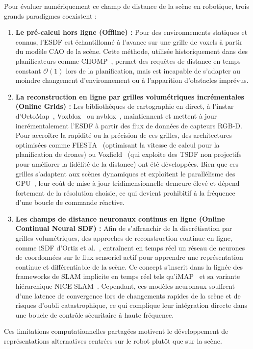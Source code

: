 Pour évaluer numériquement ce champ de distance de la scène en robotique, trois grands paradigmes coexistent :
\begin{enumerate}
    \item \textbf{Le pré-calcul hors ligne (Offline) :} Pour des environnements statiques et connus, l'\ac{ESDF} est échantillonné à l'avance sur une grille de voxels à partir du modèle \ac{CAO} de la scène. Cette méthode, utilisée historiquement dans des planificateurs comme \ac{CHOMP}~\cite{Zucker2013Chomp}, permet des requêtes de distance en temps constant $\mathcal{O}(1)$ lors de la planification, mais est incapable de s'adapter au moindre changement d'environnement ou à l'apparition d'obstacles imprévus.
    \item \textbf{La reconstruction en ligne par grilles volumétriques incrémentales (Online Grids) :} Les bibliothèques de cartographie en direct, à l'instar d'OctoMap~\cite{Hornung2013Octomap}, Voxblox~\cite{Oleynikova2017Voxblox} ou nvblox~\cite{Millane2024Nvblox}, maintiennent et mettent à jour incrémentalement l'\ac{ESDF} à partir des flux de données de capteurs \ac{RGB-D}. Pour accroître la rapidité ou la précision de ces grilles, des architectures optimisées comme FIESTA~\cite{Han2019Fiesta} (optimisant la vitesse de calcul pour la planification de drones) ou Voxfield~\cite{Pan2022Voxfield} (qui exploite des \ac{TSDF} non projectifs pour améliorer la fidélité de la distance) ont été développées. Bien que ces grilles s'adaptent aux scènes dynamiques et exploitent le parallélisme des \ac{GPU}~\cite{Bedada2024Real}, leur coût de mise à jour tridimensionnelle demeure élevé et dépend fortement de la résolution choisie, ce qui devient prohibitif à la fréquence d'une boucle de commande réactive.
    \item \textbf{Les champs de distance neuronaux continus en ligne (Online Continual Neural \ac{SDF}) :} Afin de s'affranchir de la discrétisation par grilles volumétriques, des approches de reconstruction continue en ligne, comme iSDF d'Ortiz et al.~\cite{Ortiz2022Isdf}, entraînent en temps réel un réseau de neurones de coordonnées sur le flux sensoriel actif pour apprendre une représentation continue et différentiable de la scène. Ce concept s'inscrit dans la lignée des frameworks de \ac{SLAM} implicite en temps réel tels qu'iMAP~\cite{Sucar2021Imap} et sa variante hiérarchique NICE-\ac{SLAM}~\cite{Zhu2022Niceslam}. Cependant, ces modèles neuronaux souffrent d'une latence de convergence lors de changements rapides de la scène et de risques d'oubli catastrophique, ce qui complique leur intégration directe dans une boucle de contrôle sécuritaire à haute fréquence.
\end{enumerate}
Ces limitations computationnelles partagées motivent le développement de représentations alternatives centrées sur le robot plutôt que sur la scène.



